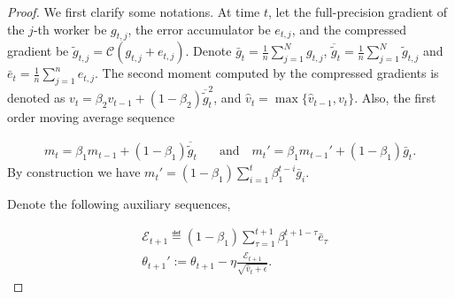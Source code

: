 \documentclass[11pt]{article}
\begin{document}
\begin{proof}
We first clarify some notations. At time $t$, let the full-precision gradient of the $j$-th worker be $g_{t,j}$, the error accumulator be $e_{t,j}$, and the compressed gradient be $\tilde g_{t,j}=\mathcal C(g_{t,j}+e_{t,j})$. Denote $\bar g_t=\frac{1}{n}\sum_{j=1}^N g_{t,j}$, $\overline{\tilde g}_t=\frac{1}{n}\sum_{j=1}^N \tilde g_{t,j}$ and $\bar e_t=\frac{1}{n}\sum_{j=1}^n e_{t,j}$. The second moment computed by the compressed gradients is denoted as $v_t=\beta_2 v_{t-1}+(1-\beta_2) \overline{\tilde g}_t^2$, and $\hat v_t=\max\{\hat v_{t-1}, v_t\}$. Also, the first order moving average sequence

\begin{align*}
m_t=\beta_1 m_{t-1}+(1-\beta_1)\overline{\tilde g}_t \quad & \textrm{and} \quad m_t'=\beta_1 m_{t-1}'+(1-\beta_1) \bar g_t.
\end{align*}
By construction we have $m_t'=(1-\beta_1)\sum_{i=1}^t \beta_1^{t-i} \bar g_i$. 

Denote the following auxiliary sequences,

\begin{align*}
& \mathcal E_{t+1}\eqdef (1-\beta_1)\sum_{\tau=1}^{t+1} \beta_1^{t+1-\tau} \bar e_\tau\\
&\theta_{t+1}':=\theta_{t+1}-\eta \frac{\mathcal E_{t+1}}{\sqrt{\hat v_t+\epsilon}}.
\end{align*}


\end{proof}
\end{document}
